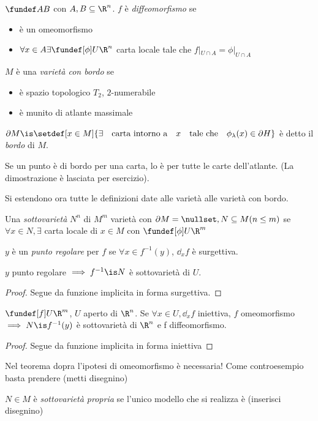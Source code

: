 \begin{defn}
$\fundef AB$ con $A,B\subseteq \R^n$. $f$ è \emph{diffeomorfismo} se
\begin{itemize}
 \item è un omeomorfismo
 \item $\forall x\in A \exists \fundef[\phi] U\R^n$ carta locale tale che $f|_{U\cap A}=\phi|_{U\cap A}$
\end{itemize}
\end{defn}
\begin{defn}
 $M$ è una \emph{varietà con bordo} se 
 \begin{itemize}
  \item è spazio topologico $T_2$, $2$-numerabile
  \item è munito di atlante massimale 
 \end{itemize}
\end{defn}
\begin{defn}[Bordo]
$\partial M\is \setdef[x\in M]{\exists\quad \text{carta intorno a}\quad x \quad\text{tale che}\quad \phi_{\lambda}(x) \in \partial H}$ è detto il \emph{bordo} di $M$.
\end{defn}
\begin{prop}
 Se un punto è di bordo per una carta, lo è per tutte le carte dell'atlante. (La dimostrazione è lasciata per esercizio).
\end{prop}
Si estendono ora tutte le definizioni date alle varietà alle varietà con bordo.
\begin{defn}[Sottovarietà]
 Una \emph{sottovarietà} $N^n$ di $M^m$ varietà con $\partial M = \nullset, N\subseteq M (n\le m)$ se $\forall x\in N, \exists$ carta locale di $x \in M$ con $\fundef[\phi] U\R^m $
\end{defn}
\begin{defn}
 $y$ è un \emph{punto regolare} per $f$ se $\forall x\in f^{-1}(y)$, $\dd_xf$ è surgettiva.
\end{defn}
\begin{prop}
 $y$ punto regolare $\implies f^{-1}\is N$ è sottovarietà di $U$.
\end{prop}
\begin{proof}
 Segue da funzione implicita in forma surgettiva.
\end{proof}
\begin{prop}
 $\fundef[f] U\R^m$, $U$ aperto di $\R^n$. Se $\forall x \in U, \dd_xf$ iniettiva, $f$ omeomorfismo$\implies N\is f^{-1}(y)$ è sottovarietà di $\R^n$ e f diffeomorfismo.
\end{prop}
\begin{proof}
 Segue da funzione implicita in forma iniettiva
\end{proof}
\begin{oss}
 Nel teorema dopra l'ipotesi di omeomorfismo è necessaria!
 Come controesempio basta prendere (metti disegnino)
\end{oss}

\begin{defn}
 $N\in M$ è \emph{sottovarietà propria} se l'unico modello che si realizza è (inserisci disegnino)
\end{defn}

